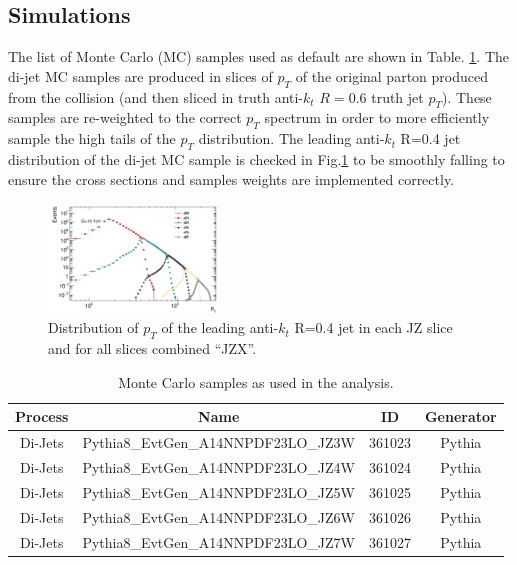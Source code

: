 \subsection{Simulations}

The list of Monte Carlo (MC) samples used as default are shown in Table. \ref{tab:mc_samples1}. The di-jet MC samples are produced in slices of $p_{T}$ of the original parton produced from the collision (and then sliced in truth anti-$k_t$ $R=0.6$ truth jet $p_T$).  These samples are re-weighted to the correct $p_{T}$ spectrum in order to more efficiently sample the high tails of the $p_{T}$ distribution. The leading anti-$k_t$ R=0.4 jet distribution of the di-jet MC sample is checked in Fig.\ref{fig:gbb-leadAkt4} to be smoothly falling to ensure the cross sections and samples weights are implemented correctly.

\begin{figure}[htbp]
  \centering
 \includegraphics[width=0.4\textwidth]{figures/gbb/LeadJetCheck.png}
\caption{Distribution of $p_T$ of the leading anti-$k_t$ R=0.4 jet in each JZ slice and for all slices combined ``JZX''.}
  \label{fig:gbb-leadAkt4}
\end{figure}


\begin{table}[htpb]
\centering
\begin{tabular}{cccc}
Process & Name & ID & Generator \\
\hline 
\hline
Di-Jets & Pythia8\_EvtGen\_A14NNPDF23LO\_JZ3W & 361023 & Pythia  \\
Di-Jets & Pythia8\_EvtGen\_A14NNPDF23LO\_JZ4W & 361024 & Pythia  \\
Di-Jets & Pythia8\_EvtGen\_A14NNPDF23LO\_JZ5W & 361025 & Pythia  \\
Di-Jets & Pythia8\_EvtGen\_A14NNPDF23LO\_JZ6W & 361026 & Pythia  \\
Di-Jets & Pythia8\_EvtGen\_A14NNPDF23LO\_JZ7W & 361027 & Pythia  \\
\hline
\hline
\end{tabular}
\caption{Monte Carlo samples as used in the analysis. }
\label{tab:mc_samples1}
\end{table}


